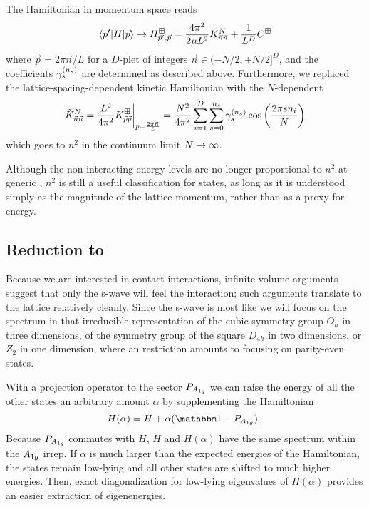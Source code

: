 The Hamiltonian in momentum space reads
\begin{equation}
    \label{eq:p space hamiltonian}
    \left\langle \vec{p}' \middle| H \middle| \vec{p} \right\rangle
    \rightarrow
    H_{\vec{p}',\vec{p}}^\boxplus
    =
    \frac{4 \pi^2}{2\mu L^2} \tilde K_{\vec n \vec n}^{N}
    +\frac{1}{L^D}C^\boxplus
\end{equation}
where $\vec{p} = 2\pi \vec{n}/L$ for a $D$-plet of integers $\vec{n} \in (-N/2, +N/2]^D$, and the coefficients $\gamma_{s}^{({n_s})}$ are determined as described above.
Furthermore, we replaced the lattice-spacing-dependent kinetic Hamiltonian with the $N$-dependent
\begin{equation}\label{eq:normalized-kinetic-hamitlonian}
	\tilde K_{\vec n \vec n}^{N}
	= \frac{L^2}{4\pi^2} K_{\vec p \vec p}^{\boxplus} \bigg|_{p=\frac{2\pi \vec n}{L}}
	= \frac{N^2}{4\pi^2}
    \sum_{i=1}^{D}\sum_{s=0}^{{n_s}} \gamma_s^{({n_s})} \cos\left(\frac{2 \pi s n_i}{N}\right)
\end{equation}
which goes to $n^2$ in the continuum limit $N\rightarrow\infty$.

Although the non-interacting energy levels are no longer proportional to $n^2$ at generic \nstep, $n^2$ is still a useful classification for states, as long as it is understood simply as the magnitude of the lattice momentum, rather than as a proxy for energy.

\subsection{Reduction to \Aoneg}

Because we are interested in contact interactions, infinite-volume arguments suggest that only the s-wave will feel the interaction; such arguments translate to the lattice relatively cleanly.
Since the s-wave is most like \Aoneg we will focus on the spectrum in that irreducible representation of the cubic symmetry group $O_h$ in three dimensions, of the symmetry group of the square $D_{4h}$ in two dimensions, or $Z_2$ in one dimension, where an \Aoneg restriction amounts to focusing on parity-even states.

With a projection operator to the \Aoneg sector $P_{A_{1g}}$ we can raise the energy of all the other states an arbitrary amount $\alpha$ by supplementing the Hamiltonian
\begin{equation}
    H(\alpha) = H + \alpha (\one - P_{\Aoneg}) \, ,
\end{equation}
Because $P_{A_{1g}}$ commutes with $H$, $H$ and $H(\alpha)$ have the same spectrum within the $A_{1g}$ irrep.
If $\alpha$ is much larger than the expected energies of the Hamiltonian, the \Aoneg states remain low-lying and all other states are shifted to much higher energies.
Then, exact diagonalization for low-lying eigenvalues of $H(\alpha)$ provides an easier extraction of \Aoneg eigenenergies.


